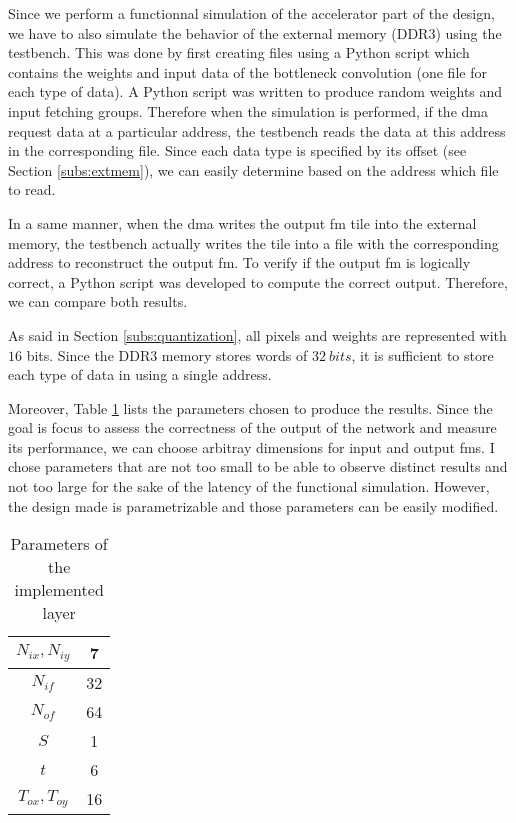 Since we perform a functionnal simulation of the accelerator part of the design, we have to also simulate the behavior of the external memory (DDR3) using the testbench. This was done by first creating files using a Python script which contains the weights and input data of the bottleneck convolution (one file for each type of data). A Python script was written to produce random weights and input fetching groups. Therefore when the simulation is performed, if the \acrshort{dma} request data at a particular address, the testbench reads the data at this address in the corresponding file. Since each data type is specified by its offset (see Section \ref{subs:extmem}), we can easily determine based on the address which file to read.

In a same manner, when the \acrshort{dma} writes the output \acrshort{fm} tile into the external memory, the testbench actually writes the tile into a file with the corresponding address to reconstruct the output \acrshort{fm}. To verify if the output \acrshort{fm} is logically correct, a Python script was developed to compute the correct output. Therefore, we can compare both results.

As said in Section \ref{subs:quantization}, all pixels and weights are represented with $16$ bits. Since the DDR3 memory stores words of $32 \ bits$, it is sufficient to store each type of data in using a single address.

Moreover, Table \ref{tab:param} lists the parameters chosen to produce the results. Since the goal is focus to assess the correctness of the output of the network and measure its performance, we can choose arbitray dimensions for input and output \acrshort{fm}s. I chose parameters that are not too small to be able to observe distinct results and not too large for the sake of the latency of the functional simulation. However, the design made is parametrizable and those parameters can be easily modified.
%
\begin{table}[H]
    \centering
    \begin{tabular}{|c|c|}
    \hline
    $N_{ix}, N_{iy}$ & 7 \\
    \hline
    $N_{if} $ & 32 \\
    \hline
    $N_{of}$ & 64 \\
    \hline
    $S$ & 1\\
    \hline
    $t$ & 6 \\
    \hline
    $T_{ox}, T_{oy}$ & 16 \\
    \hline
    \end{tabular}
    \caption{Parameters of the implemented layer}
    \label{tab:param}
\end{table}
%

